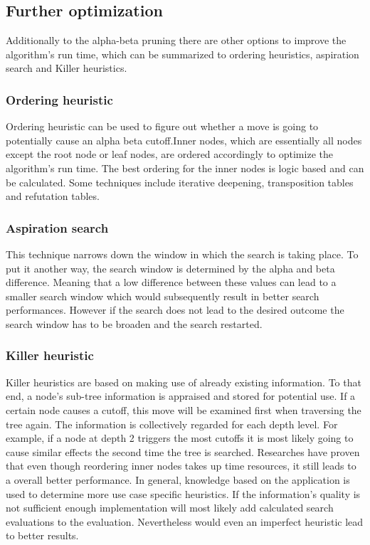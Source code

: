 \documentclass[conference,pdf,table,xcdraw, utf8]{IEEEtran}
\begin{document}
\subsection{Further optimization}
Additionally to the alpha-beta pruning there are other options to improve the algorithm's run time, which can be summarized to ordering heuristics, aspiration search and Killer heuristics. \cite{jonathan1989historyHeuristic}\cite{nasa2018alpha}


\subsubsection{Ordering heuristic}
Ordering heuristic can be used to figure out whether a move is going to potentially cause an alpha beta cutoff.Inner nodes, which are essentially all nodes except the root node or leaf nodes, are ordered accordingly to optimize the algorithm's run time. The best ordering for the inner nodes is logic based and can be calculated. Some techniques include iterative deepening, transposition tables and refutation tables. \cite{jonathan1989historyHeuristic}


\subsubsection{Aspiration search }
This technique narrows down the window in which the search is taking place. To put it another way, the search window is determined by the alpha and beta difference. Meaning that a low difference between these values can lead to a smaller search window which would subsequently result in better search performances. However if the search does not lead to the desired outcome the search window has to be broaden and the search restarted. \cite{jonathan1989historyHeuristic}



\subsubsection{Killer heuristic }
Killer heuristics are based on making use of already existing information. To that end, a node's sub-tree information is appraised and stored for potential use. If a certain node causes a cutoff, this move will be examined first when traversing the tree again. The information is collectively regarded for each depth level. For example, if a node at depth 2 triggers the most cutoffs it is most likely going to cause similar effects the second time the tree is searched.
Researches have proven that even though reordering inner nodes takes up time resources, it still leads to a overall better performance. In general, knowledge based on the application is used to determine more use case specific heuristics. If the information's quality is not sufficient enough implementation will most likely add calculated search evaluations to the evaluation.
Nevertheless would even an imperfect heuristic lead to better results. \cite{jonathan1989historyHeuristic}
\end{document}
